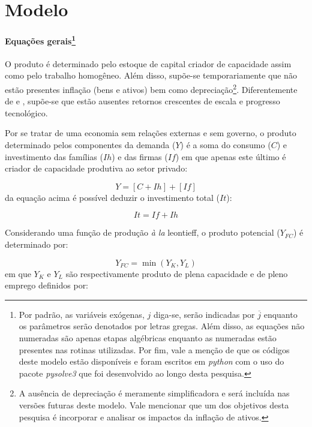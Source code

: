 \section{Modelo}
\label{SecModelo}

\paragraph*{Equações gerais\footnote{Por padrão, as variáveis exógenas, $j$ diga-se, serão indicadas por $\overline{j}$ enquanto os parâmetros serão denotados por letras gregas. Além disso, as equações não numeradas são apenas etapas algébricas enquanto as numeradas estão presentes nas rotinas utilizadas. Por fim, vale a menção de que os códigos deste modelo estão disponíveis e foram escritos em \textit{python} com o uso do pacote \textit{pysolve3} que foi desenvolvido ao longo desta pesquisa.}}
O produto é determinado pelo estoque de capital criador de capacidade assim como pelo trabalho homogêneo. Além disso, supõe-se temporariamente que não estão presentes inflação (bens e ativos) bem como depreciação\footnote{A ausência de depreciação é meramente simplificadora e será incluída nas versões futuras deste modelo. Vale mencionar que um dos objetivos desta pesquisa é incorporar e analisar os impactos da inflação de ativos.}.  Diferentemente de \textcite{nikiforos_utilization_2016} e \textcite{dutt_observations_2018}, supõe-se que estão ausentes retornos crescentes de escala e progresso tecnológico.

Por se tratar de uma economia sem relações externas e sem governo, o produto determinado pelos componentes da demanda ($Y$) é a soma do consumo ($C$) e investimento das famílias ($Ih$) e das firmas ($If$) em que apenas este último é criador de capacidade produtiva ao setor privado:

\begin{equation}
\label{_Y}
    Y = [C + Ih] + [If]
\end{equation}
da equação acima é possível deduzir o investimento total ($It$):

\begin{equation}
\label{_It}
    It = If + Ih
\end{equation}

Considerando uma função de produção \textit{à la} leontieff, o produto potencial ($Y_{FC}$) é determinado por:

$$
Y_{FC} = \min (Y_K, Y_L)
$$
em que $Y_K$ e $Y_L$ são respectivamente produto de plena capacidade e de pleno emprego definidos por:


